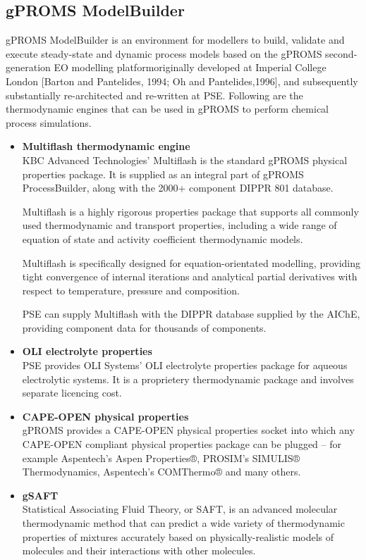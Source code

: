 \documentclass[12pt]{report}
\begin{document}
\subsection{gPROMS ModelBuilder}
gPROMS ModelBuilder is an environment for modellers to build, validate and execute steady-state and dynamic process models based on the gPROMS second-generation EO modelling platformoriginally developed at Imperial College London [Barton and Pantelides, 1994; Oh and Pantelides,1996], and subsequently substantially re-architected and re-written at PSE. Following are the thermodynamic engines that can be used in gPROMS to perform chemical process simulations.
\begin{itemize}
\item \textbf{Multiflash thermodynamic engine} \\
KBC Advanced Technologies' Multiflash is the standard gPROMS physical properties package. It is supplied as an integral part of gPROMS ProcessBuilder, along with the 2000+ component DIPPR 801 database.

Multiflash is a highly rigorous properties package that supports all commonly used thermodynamic and transport properties, including a wide range of equation of state and activity coefficient thermodynamic models.

Multiflash is specifically designed for equation-orientated modelling, providing tight convergence of internal iterations and analytical partial derivatives with respect to temperature, pressure and composition.

PSE can supply Multiflash with the DIPPR database supplied by the AIChE, providing component data for thousands of components.

\item \textbf{OLI electrolyte properties} \\
PSE provides OLI Systems' OLI electrolyte properties package for aqueous electrolytic systems. It is a proprietery thermodynamic package and involves separate licencing cost.

\item \textbf{CAPE-OPEN physical properties} \\
gPROMS provides a CAPE-OPEN physical properties socket into which any CAPE-OPEN compliant physical properties package can be plugged – for example Aspentech's Aspen Properties®, PROSIM's SIMULIS® Thermodynamics, Aspentech's COMThermo® and many others.

\item \textbf{gSAFT} \\
Statistical Associating Fluid Theory, or SAFT, is an advanced molecular thermodynamic method that can predict a wide variety of thermodynamic properties of mixtures accurately based on physically-realistic models of molecules and their interactions with other molecules.
\end{itemize}
\end{document}
